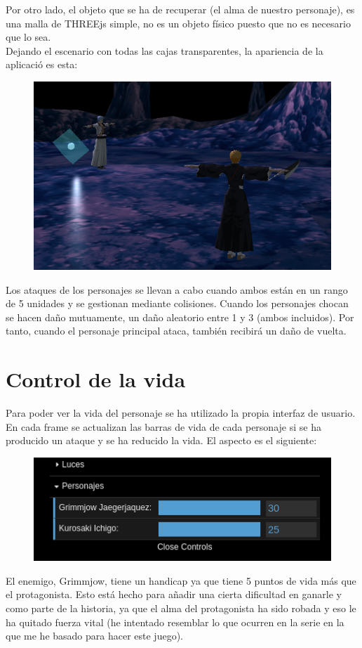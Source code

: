 \documentclass[11pt,a4paper]{article}
\begin{document}
Por otro lado, el objeto que se ha de recuperar (el alma de nuestro personaje), es una malla de THREEjs simple, no es un objeto físico puesto que no es necesario que lo sea.\\

Dejando el escenario con todas las cajas transparentes, la apariencia de la aplicació es esta:

\begin{figure}[H]
	\centering
	\includegraphics[scale=0.37]{img/inicio.png}
\end{figure}

Los ataques de los personajes se llevan a cabo cuando ambos están en un rango de 5 unidades y se gestionan mediante colisiones. Cuando los personajes chocan se hacen daño mutuamente, un daño aleatorio entre 1 y 3 (ambos incluidos). Por tanto, cuando el personaje principal ataca, también recibirá un daño de vuelta.

\section{Control de la vida}

Para poder ver la vida del personaje se ha utilizado la propia interfaz de usuario. En cada frame se actualizan las barras de vida de cada personaje si se ha producido un ataque y se ha reducido la vida. El aspecto es el siguiente:

\begin{figure}[H]
	\centering
	\includegraphics[scale=0.5]{img/barravida.png}
\end{figure}

El enemigo, Grimmjow, tiene un handicap ya que tiene 5 puntos de vida más que el protagonista. Esto está hecho para añadir una cierta dificultad en ganarle y como parte de la historia, ya que el alma del protagonista ha sido robada y eso le ha quitado fuerza vital (he intentado resemblar lo que ocurren en la serie en la que me he basado para hacer este juego).
\end{document}
